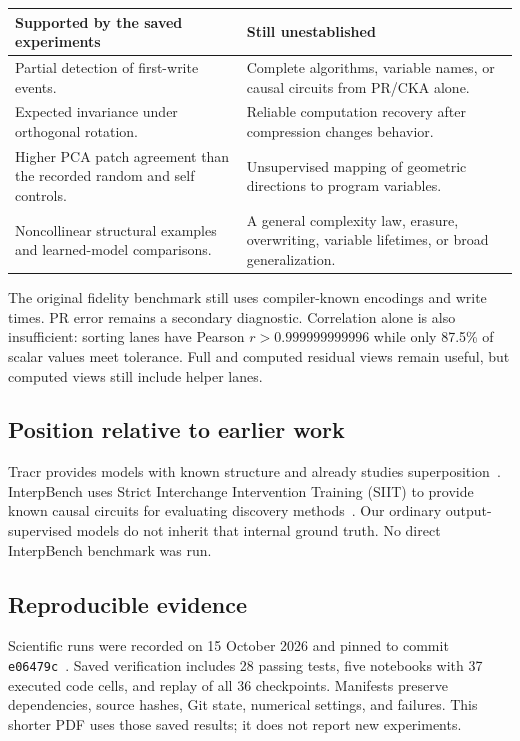\documentclass[11pt,a4paper]{article}
\begin{document}
\begin{center}\small
\begin{tabularx}{\linewidth}{@{}XX@{}}
\toprule
\textbf{Supported by the saved experiments} & \textbf{Still unestablished}\\
\midrule
Partial detection of first-write events. & Complete algorithms, variable names, or causal circuits from PR/CKA alone.\\
Expected invariance under orthogonal rotation. & Reliable computation recovery after compression changes behavior.\\
Higher PCA patch agreement than the recorded random and self controls. & Unsupervised mapping of geometric directions to program variables.\\
Noncollinear structural examples and learned-model comparisons. & A general complexity law, erasure, overwriting, variable lifetimes, or broad generalization.\\
\bottomrule
\end{tabularx}\end{center}

The original fidelity benchmark still uses compiler-known encodings and write times. PR error remains a secondary diagnostic. Correlation alone is also insufficient: sorting lanes have Pearson $r>0.999999999996$ while only 87.5\% of scalar values meet tolerance. Full and computed residual views remain useful, but computed views still include helper lanes.

\subsection*{Position relative to earlier work}
Tracr provides models with known structure and already studies superposition~\cite{tracr}. InterpBench uses Strict Interchange Intervention Training (SIIT) to provide known causal circuits for evaluating discovery methods~\cite{interpbench}. Our ordinary output-supervised models do not inherit that internal ground truth. No direct InterpBench benchmark was run.

\subsection*{Reproducible evidence}
Scientific runs were recorded on 15 October 2026 and pinned to commit \texttt{e06479c}~\cite{artifact}. Saved verification includes 28 passing tests, five notebooks with 37 executed code cells, and replay of all 36 checkpoints. Manifests preserve dependencies, source hashes, Git state, numerical settings, and failures. This shorter PDF uses those saved results; it does not report new experiments.
\end{document}
